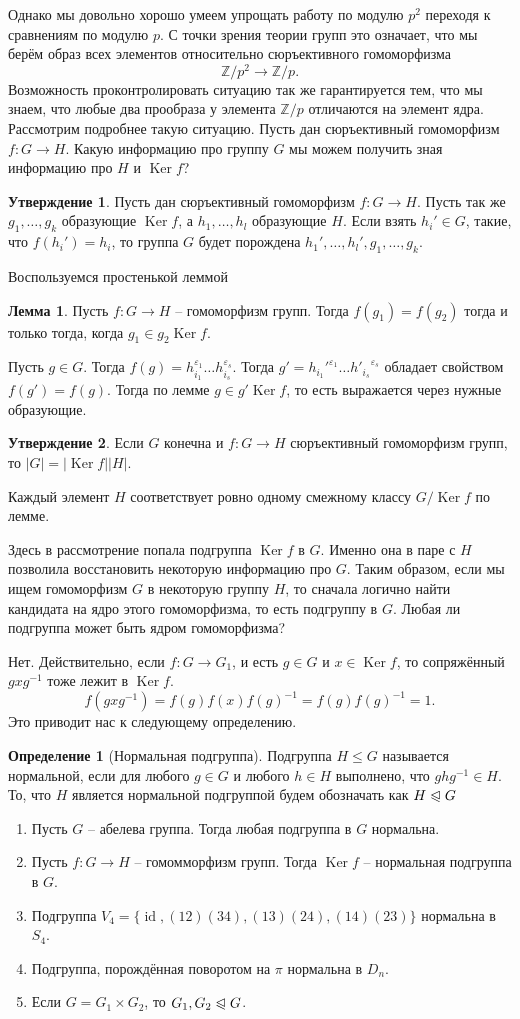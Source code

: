 \documentclass[10pt,a4paper,oneside]{book}
\theoremstyle{definition}
\newtheorem*{defn}{\color{yellow!30!red} Определение}
\newtheorem{lem}{\color{green!50!black}Лемма}
\newtheorem{utvr}{\color{blue!50!black}Утверждение}
\renewcommand{\leq}{\leqslant}
\newcommand{\mb}[1]{\mathbb{#1}}
\newcommand{\id}{\operatorname{id}}
\DeclareMathOperator{\Ker}{Ker}
\def\exm{\noindent {\bf Примеры:}}
\def\eps{\varepsilon}
\def\dfn{\begin{defn}}
\def\edfn{\end{defn}}
\def\lm{\begin{lem}}
\def\elm{\end{lem}}
\def\enm{\begin{enumerate}}
\def\eenm{\end{enumerate}}
\def\utv{\begin{utvr}}
\def\eutv{\end{utvr}}
\def\nrml{\trianglelefteqslant}
\begin{document}
Однако мы довольно хорошо умеем упрощать работу по модулю $p^2$ переходя к сравнениям по модулю $p$. С точки зрения теории групп это означает, что мы берём образ всех элементов относительно сюръективного гомоморфизма 
$$\mb Z/p^2 \to \mb Z/p.$$
Возможность проконтролировать ситуацию так же гарантируется тем, что мы знаем, что любые два прообраза у элемента $\mb Z/p$ отличаются на элемент ядра.
Рассмотрим подробнее такую ситуацию. Пусть дан сюръективный гомоморфизм $f \colon G \to H$. Какую информацию про группу $G$ мы можем получить зная информацию про $H$ и $\Ker f$?

\utv Пусть дан сюръективный гомоморфизм $f \colon G \to H$. Пусть так же $g_1,\dots,g_k$ образующие $\Ker f$, а $h_1,\dots, h_l$ образующие $H$. Если взять $h_i'\in G$, такие, что $f(h_i')=h_i$, то группа $G$ будет порождена $h_1',\dots,h_l', g_1,\dots,g_k$.
\eutv
\proof  Воспользуемся простенькой леммой
\lm Пусть $f\colon G \to H$ -- гомоморфизм групп. Тогда $f(g_1)=f(g_2)$ тогда и только тогда, когда $g_1\in g_2 \Ker f$.
\elm
Пусть $g\in G$. Тогда $f(g)=h_{i_1}^{\eps_1}\dots h_{i_s}^{\eps_s}$. Тогда $g'={h_{i_1}'}^{\eps_1}\dots {h'_{i_s}}^{\eps_s}$ обладает свойством $f(g')=f(g)$. Тогда по лемме $g\in g'\Ker f$, то есть выражается через нужные образующие.
\endproof

\utv  Если $G$ конечна  и  $f\colon G \to H$ сюръективный гомоморфизм групп, то $|G|=|\Ker f| |H|$.
\eutv
\proof Каждый элемент $H$ соответствует ровно одному смежному классу $G/\Ker f$ по лемме.
\endproof

Здесь в рассмотрение попала подгруппа $\Ker f$ в $G$. Именно она в паре с $H$ позволила восстановить некоторую информацию про $G$. Таким образом, если мы ищем гомоморфизм $G$ в некоторую группу $H$, то сначала логично найти кандидата на ядро этого гомоморфизма, то есть подгруппу в $G$. Любая ли подгруппа может быть ядром гомоморфизма? 

Нет. Действительно, если $f \colon G \to G_1$, и есть $g \in G$ и $x\in \Ker f$, то  сопряжённый $gxg^{-1}$ тоже лежит в $\Ker f$. 
$$f(gxg^{-1})=f(g)f(x)f(g)^{-1}=f(g)f(g)^{-1}=1.$$
Это приводит нас к следующему определению.

\dfn[Нормальная подгруппа] Подгруппа $H\leq G$ называется нормальной, если для любого $g\in G$ и любого $h \in H$ выполнено, что $ghg^{-1}\in H$. То, что $H$ является нормальной подгруппой будем обозначать как $H \nrml G$
\edfn

\exm \enm
\item Пусть $G$ -- абелева группа. Тогда любая подгруппа в $G$ нормальна.
\item Пусть $f\colon G \to H$ -- гомомморфизм групп. Тогда $\Ker f$ -- нормальная подгруппа в $G$.
\item Подгруппа $V_4=\{\id, (12)(34), (13)(24), (14)(23)\}$ нормальна в $S_4$.
\item Подгруппа, порождённая поворотом на $\pi$ нормальна в $D_n$.
\item Если $G=G_1\times G_2$, то $G_1,G_2\nrml G$.
\eenm
\end{document}
